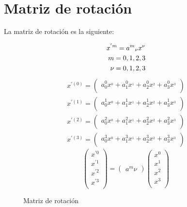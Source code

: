 \section*{Matriz de rotaci\'on}
La matriz de rotación es la siguiente:

\begin{figure}[h!]
		\begin{eqnarray*}
			x^{'m} = a^{m}\hfill_{\nu} x^{\nu}\\
			m = 0,1,2,3\\
			\nu = 0,1,2,3
		\end{eqnarray*}		
		\begin{eqnarray*}
			x^{'(0)} =
			\left( {\begin{array}{cc}
					a^{0} _0 x^{_0} + a^{0} _1 x^{_1} + a^{0} _2 x^{_2} + a^{0} _3 x^{_3}\\
			\end{array} } \right)\\
		x^{'(1)} =
		\left( {\begin{array}{cc}
				a^{1} _0 x^{_0} + a^{1} _1 x^{_1} + a^{1} _2 x^{_2} + a^{1} _3 x^{_3}\\
		\end{array} } \right)\\
		x^{'(2)} =
		\left( {\begin{array}{cc}
				a^{2} _0 x^{_0} + a^{2} _1 x^{_1} + a^{2} _2 x^{_2} + a^{2} _3 x^{_3}\\
		\end{array} } \right)\\
		x^{'(3)} =
		\left( {\begin{array}{cc}
				a^{3} _0 x^{_0} + a^{3} _1 x^{_1} + a^{3} _2 x^{_2} + a^{3} _3 x^{_3}\\
		\end{array} } \right)
		\end{eqnarray*}
		\begin{equation*}
			\left(
			\begin{array}{ccc}
				x^{'0}\\
				x^{'1}\\
				x^{'2}\\
				x^{'3}\\ 
			\end{array}
			\right)
			=
			\left(
			\begin{array}{c}
				a^{m}\nu
			\end{array}
			\right)
			{}
			\left(
			\begin{array}{ccc}
				x^{0}\\
				x^{1}\\
				x^{2}\\
				x^{3}\\ 
			\end{array}
			\right)
		\end{equation*}		
	\caption{Matriz de rotaci\'on}
	\label{permutaciones_tree}
\end{figure}